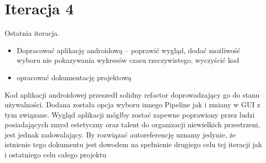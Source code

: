 \section{Iteracja 4}

\begin{Note}

Ostatnia iteracja. 


\begin{itemize}
    \item Dopracować aplikację androidową -- poprawić wygląd, dodać możliwość wyboru nie pokazywania wykresów czasu rzeczywistego, wyczyścić kod
    \item opracować dokumentację projektową
\end{itemize}

Kod aplikacji androidowej przeszedł solidny refactor doprowadzający go do stanu używalności. Dodana została opcja wyboru innego Pipeline jak i zmiany w GUI z tym związane. Wygląd aplikacji mógłby zostać zapewne poprawiony przez ludzi posiadających zmysł estetyczny oraz talent do organizacji niewielkich przestrzeni, jest jednak zadowalający.
By rozwiązać autoreferencję uznamy jedynie, że istnienie tego dokumentu jest dowodem na spełnienie drugiego celu tej iteracji jak i ostatniego celu całego projektu

\end{Note}

\nocite{*}

